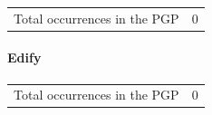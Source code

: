 			\begin{tabular}{ll}
				Total occurrences in the PGP & 0
			\end{tabular}
			
			
		\paragraph{Edify}
	
			\begin{tabular}{ll}
				Total occurrences in the PGP & 0
			\end{tabular}
			
		

	


